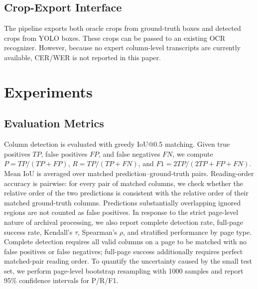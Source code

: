 \documentclass[12pt]{article}
\begin{document}
\subsection{Crop-Export Interface}
The pipeline exports both oracle crops from ground-truth boxes and detected crops from YOLO boxes. These crops can be passed to an existing OCR recognizer. However, because no expert column-level transcripts are currently available, CER/WER is not reported in this paper.

\section{Experiments}
\subsection{Evaluation Metrics}
Column detection is evaluated with greedy IoU@0.5 matching. Given true positives $TP$, false positives $FP$, and false negatives $FN$, we compute $P=TP/(TP+FP)$, $R=TP/(TP+FN)$, and $F1=2TP/(2TP+FP+FN)$. Mean IoU is averaged over matched prediction--ground-truth pairs. Reading-order accuracy is pairwise: for every pair of matched columns, we check whether the relative order of the two predictions is consistent with the relative order of their matched ground-truth columns. Predictions substantially overlapping ignored regions are not counted as false positives. In response to the strict page-level nature of archival processing, we also report complete detection rate, full-page success rate, Kendall's $\tau$, Spearman's $\rho$, and stratified performance by page type. Complete detection requires all valid columns on a page to be matched with no false positives or false negatives; full-page success additionally requires perfect matched-pair reading order. To quantify the uncertainty caused by the small test set, we perform page-level bootstrap resampling with 1000 samples and report 95\% confidence intervals for P/R/F1.
\end{document}
